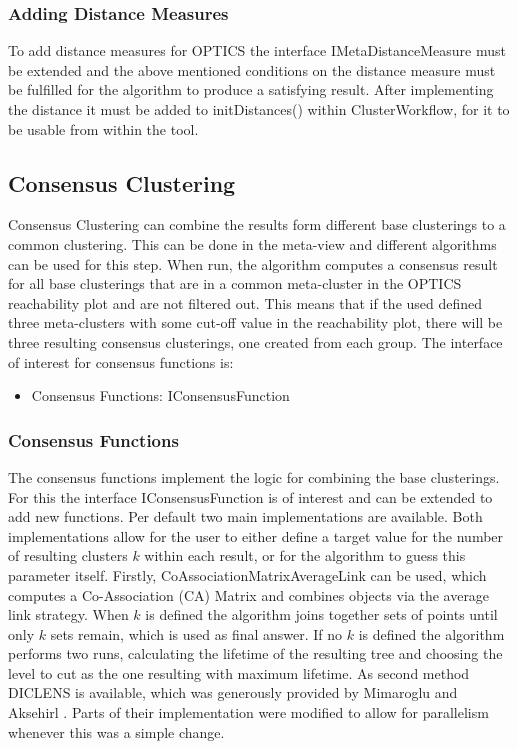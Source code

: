 \documentclass[
	a4paper,
	english,
	twoside,
	openright,               
	11pt                            
	]{report}
\begin{document}
\subsubsection*{Adding Distance Measures}
To add distance measures for OPTICS the interface IMetaDistanceMeasure must be extended and the above mentioned conditions on the distance measure must be fulfilled for the algorithm to produce a satisfying result. After implementing the distance it must be added to initDistances() within ClusterWorkflow, for it to be usable from within the tool.

\subsection{Consensus Clustering}
Consensus Clustering can combine the results form different base clusterings to a common clustering. This can be done in the meta-view and different algorithms can be used for this step. When run, the algorithm computes a consensus result for all base clusterings that are in a common meta-cluster in the OPTICS reachability plot and are not filtered out. This means that if the used defined three meta-clusters with some cut-off value in the reachability plot, there will be three resulting consensus clusterings, one created from each group. The interface of interest for consensus functions is:

\begin{itemize}
  \item Consensus Functions: IConsensusFunction
\end{itemize}

\subsubsection{Consensus Functions}
The consensus functions implement the logic for combining the base clusterings. For this the interface IConsensusFunction is of interest and can be extended to add new functions. Per default two main implementations are available. Both implementations allow for the user to either define a target value for the number of resulting clusters $k$ within each result, or for the algorithm to guess this parameter itself. Firstly, CoAssociationMatrixAverageLink can be used, which computes a Co-Association (CA) Matrix and combines objects via the average link strategy. When $k$ is defined the algorithm joins together sets of points until only $k$ sets remain, which is used as final answer. If no $k$ is defined the algorithm performs two runs, calculating the lifetime \cite{lifetime} of the resulting tree and choosing the level to cut as the one resulting with maximum lifetime. As second method DICLENS is available, which was generously provided by Mimaroglu and Aksehirl \cite{DICLENS}. Parts of their implementation were modified to allow for parallelism whenever this was a simple change.
\end{document}
